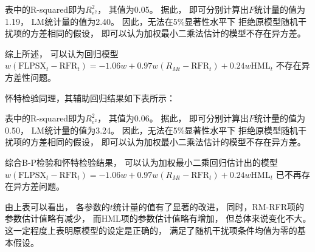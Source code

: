 \documentclass[UTF8]{ctexart}
\begin{document}
表中的R-squared即为$R_{e^2}^{2}$，
其值为0.05。
据此，
即可分别计算出$F$统计量的值为1.19，
$\mathrm{LM}$统计量的值为2.40。
因此，无法在5\%显著性水平下
拒绝原模型随机干扰项的方差相同的假设，
即可以认为加权最小二乘法估计的模型不存在异方差。

综上所述，
可以认为回归模型
$w(\text{FLPSX}_t-\mathrm{RFR}_t)=-1.06w+0.97w\left( R_{Mt}-\mathrm{RFR}_t \right)+0.24w\mathrm{HML}_t$
不存在异方差性问题。

怀特检验同理，其辅助回归结果如下表所示：


表中的R-squared即为$R_{e^2}^{2}$，
其值为0.06。
据此，
即可分别计算出$F$统计量的值为0.50，
$\mathrm{LM}$统计量的值为3.24。
因此，无法在5\%显著性水平下
拒绝原模型随机干扰项的方差相同的假设，
即可以认为加权最小二乘法估计的模型不存在异方差。

综合B-P检验和怀特检验结果，
可以认为加权最小二乘回归估计出的模型
$w(\text{FLPSX}_t-\mathrm{RFR}_t)=-1.06w+0.97w\left( R_{Mt}-\mathrm{RFR}_t \right)+0.24w\mathrm{HML}_t$
已不再存在异方差问题。


由上表可以看出，
各参数的$t$统计量的值有了显著的改进，
同时，RM-RFR项的参数估计值略有减少，
而HML项的参数估计值略有增加，
但总体来说变化不大。
这一定程度上表明原模型的设定是正确的，
满足了随机干扰项条件均值为零的基本假设。
\end{document}
